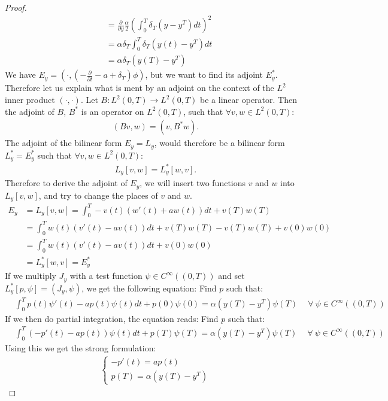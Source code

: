 \begin{proof}
\begin{align*}
&= \frac{\partial}{\partial y}\frac{\alpha}{2}(\int_0^T \delta_T(y-y^T)dt)^2 \\
&= \alpha\delta_T\int_0^T \delta_T(y(t)-y^T)dt \\
&= \alpha\delta_T(y(T)-y^T)
\end{align*}
We have $E_y=(\cdot,(-\frac{\partial}{\partial t} - a + \delta_T)\phi)$, but we want to find its adjoint $E_y^*$. Therefore let us explain what is ment by an adjoint on the context of the $L^2$ inner product $(\cdot,\cdot)$. Let $B:L^2(0,T)\rightarrow L^2(0,T)$ be a linear operator. Then the adjoint of $B$, $B^*$ is an operator on $ L^2(0,T)$, such that $\forall v,w\in L^2(0,T)$:
\begin{align*}
(Bv,w)=(v,B^*w).
\end{align*}
The adjoint of the bilinear form $E_y=L_y$, would therefore be a bilinear form $L_y^*=E_y^*$ such that $\forall v,w\in L^2(0,T)$:
\begin{align*}
L_y[v,w]=L_y^*[w,v].
\end{align*}
Therefore to derive the adjoint of $E_y$, we will insert two functions $v$ and $w$ into $L_y[v,w]$, and try to change the places of $v$ and $w$.
\begin{align*}
E_y&=L_y[v,w]=\int_0^T-v(t)(w'(t)+aw(t))dt + v(T)w(T) \\
&=\int_0^Tw(t)(v'(t)-av(t))dt + v(T)w(T)-v(T)w(T) +v(0)w(0) \\
&=\int_0^Tw(t)(v'(t)-a v(t))dt+v(0)w(0) \\
&=L_y^*[w,v]=E_y^*
\end{align*}
If we multiply $J_y$ with a test function $\psi\in C^{\infty}((0,T))$ and set $L_y^*[p,\psi]=(J_y,\psi)$, we get the following equation: Find $p$ such that:
\begin{align*}
&\int_0^Tp(t)\psi'(t)-a p(t)\psi(t)dt + p(0)\psi(0)= \alpha(y(T)-y^T)\psi(T)\ \quad\forall \ \psi \in C^{\infty}((0,T))
\end{align*}
If we then do partial integration, the equation reads: Find $p$ such that:
\begin{align*}
&\int_0^T(-p'(t)-ap(t))\psi(t)dt +p(T)\psi(T)= \alpha(y(T)-y^T)\psi(T)\ \quad\forall \ \psi \in C^{\infty}((0,T))
\end{align*}
Using this we get the strong formulation:
\begin{align*}
   \left\{
     \begin{array}{lr}
       -p'(t) = ap(t) \\
       p(T) = \alpha( y(T)-y^T)
     \end{array}
   \right.
\end{align*}
\end{proof}
